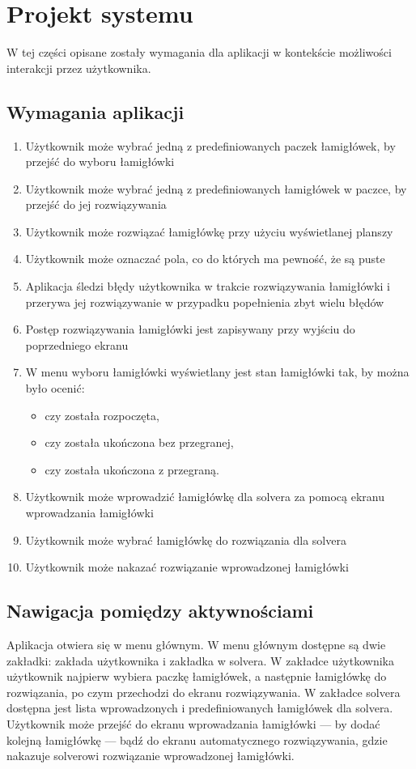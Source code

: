 \chapter{Projekt systemu}
\thispagestyle{chapterBeginStyle}

    W tej części opisane zostały wymagania dla aplikacji w kontekście możliwości interakcji przez
użytkownika.



\section{Wymagania aplikacji}
\begin{enumerate}
    \item Użytkownik może wybrać jedną z predefiniowanych paczek łamigłówek, by przejść do wyboru łamigłówki
    \item Użytkownik może wybrać jedną z predefiniowanych łamigłówek w paczce, by przejść do jej rozwiązywania
    \item Użytkownik może rozwiązać łamigłówkę przy użyciu wyświetlanej planszy
    \item Użytkownik może oznaczać pola, co do których ma pewność, że są puste
    \item Aplikacja śledzi błędy użytkownika w trakcie rozwiązywania łamigłówki i przerywa jej rozwiązywanie
w przypadku popełnienia zbyt wielu błędów
    \item Postęp rozwiązywania łamigłówki jest zapisywany przy wyjściu do poprzedniego ekranu
    \item W menu wyboru łamigłówki wyświetlany jest stan łamigłówki tak, by można było ocenić:
    \begin{itemize}
        \item czy została rozpoczęta,
        \item czy została ukończona bez przegranej,
        \item czy została ukończona z przegraną.
    \end{itemize}
    \item Użytkownik może wprowadzić łamigłówkę dla solvera za pomocą ekranu wprowadzania łamigłówki
    \item Użytkownik może wybrać łamigłówkę do rozwiązania dla solvera
    \item Użytkownik może nakazać rozwiązanie wprowadzonej łamigłówki
\end{enumerate}



\section{Nawigacja pomiędzy aktywnościami}
    Aplikacja otwiera się w menu głównym. W menu głównym dostępne są dwie zakładki: zakłada użytkownika
i zakładka w solvera. W zakładce użytkownika użytkownik najpierw wybiera paczkę łamigłówek, a
następnie łamigłówkę do rozwiązania, po czym przechodzi do ekranu rozwiązywania. W zakładce solvera
dostępna jest lista wprowadzonych i predefiniowanych łamigłówek dla solvera. Użytkownik może przejść
do ekranu wprowadzania łamigłówki — by dodać kolejną łamigłówkę — bądź do ekranu automatycznego rozwiązywania,
gdzie nakazuje solverowi rozwiązanie wprowadzonej łamigłówki.

